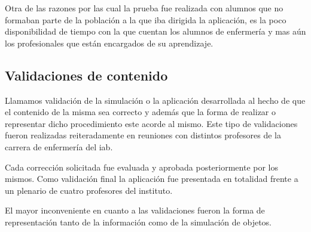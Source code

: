 Otra de las razones por las cual la prueba fue realizada con alumnos que no
formaban parte de la población a la que iba dirigida la aplicación, es la poco
disponibilidad de tiempo con la que cuentan los alumnos de enfermería y mas aún
los profesionales que están encargados de su aprendizaje.

\subsection{Validaciones de contenido}

Llamamos validación de la simulación o la aplicación desarrollada al hecho de
que el contenido de la misma sea correcto y además que la forma de realizar o
representar dicho procedimiento este acorde al mismo. Este tipo de validaciones
fueron realizadas reiteradamente en reuniones con distintos profesores de la
carrera de enfermería del \Gls{iab}.

Cada corrección solicitada fue evaluada y aprobada posteriormente por los
mismos. Como validación final la aplicación fue presentada en totalidad frente a
un plenario de cuatro profesores del instituto.

El mayor inconveniente en cuanto a las validaciones fueron la forma de
representación tanto de la información como de la simulación de objetos.
